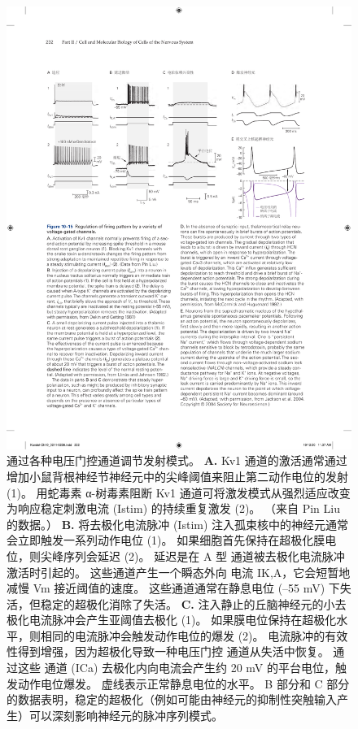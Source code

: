 \begin{figure}[htbp]
	\centering
	\includegraphics[width=0.85\linewidth]{chap10/fig_10_15}
	\caption{通过各种电压门控通道调节发射模式。
		\textbf{A.} Kv1 通道的激活通常通过增加小鼠背根神经节神经元中的尖峰阈值来阻止第二动作电位的发射 (1)。
		用蛇毒素 α-树毒素阻断 Kv1 通道可将激发模式从强烈适应改变为响应稳定刺激电流 (Istim) 的持续重复激发 (2)。 
		（来自 Pin Liu 的数据。）
		\textbf{B.} 将去极化电流脉冲 (Istim) 注入孤束核中的神经元通常会立即触发一系列动作电位 (1)。
		如果细胞首先保持在超极化膜电位，则尖峰序列会延迟 (2)。
		延迟是在 A 型  通道被去极化电流脉冲激活时引起的。
		这些通道产生一个瞬态外向  电流 IK,A，它会短暂地减慢 Vm 接近阈值的速度。
		这些通道通常在静息电位 (–55 mV) 下失活，但稳定的超极化消除了失活\cite{dekin1987vitro}。
		\textbf{C.} 注入静止的丘脑神经元的小去极化电流脉冲会产生亚阈值去极化 (1)。
		如果膜电位保持在超极化水平，则相同的电流脉冲会触发动作电位的爆发 (2)。
		电流脉冲的有效性得到增强，因为超极化导致一种电压门控  通道从失活中恢复。
		通过这些  通道 (ICa) 去极化内向电流会产生约 20 mV 的平台电位，触发动作电位爆发。
		虚线表示正常静息电位的水平\cite{llinas1982electrophysiology}。
		B 部分和 C 部分的数据表明，稳定的超极化（例如可能由神经元的抑制性突触输入产生）可以深刻影响神经元的脉冲序列模式。
}
\end{figure}
